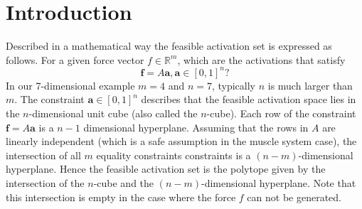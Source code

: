 \section{Introduction}
Described in a mathematical way the feasible activation set is expressed as follows. For a given force vector $f \in \mathbb{R}^m$, which are the activations that satisfy
\[\textbf{f} = A\textbf{a}, \textbf{a} \in [0,1]^n?\]
In our 7-dimensional example $m =4$ and $n =7$, typically $n$ is much larger than $m$.
The constraint $\textbf{a} \in [0,1]^n$ describes that the feasible activation space lies in the $n$-dimensional unit cube (also called the $n$-cube). Each row of the constraint $\textbf{f} = A\textbf{a}$ is a $n-1$ dimensional hyperplane. Assuming that the rows in $A$ are linearly independent (which is a safe assumption in the muscle system case), the intersection of all $m$ equality constraints constraints is a $(n-m)$-dimensional hyperplane. Hence the feasible activation set is the polytope given by the intersection of the $n$-cube and the $(n-m)$-dimensional hyperplane. Note that this intersection is empty in the case where the force $f$ can not be generated.

